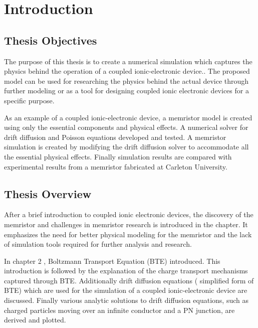 
\chapter{Introduction} %


\label{Chapter1} %


\section{Thesis Objectives}
\begin{doublespace}
The purpose of this thesis is to create a numerical simulation which captures the physics behind the operation of a coupled ionic-electronic device.. The proposed model can be used for researching the physics behind the actual device through further modeling or as a tool for designing coupled ionic electronic devices for a specific purpose. 

As an example of a coupled ionic-electronic device, a memristor model is created using only the essential components and physical effects. A numerical solver for  drift diffusion and Poisson equations  developed and tested. A memristor simulation is created by modifying the drift diffusion solver to accommodate all the essential physical effects. Finally simulation results are compared with experimental results from a memristor fabricated at Carleton University.

\section{Thesis Overview}

After a brief introduction to coupled ionic electronic devices, the discovery of the memristor and challenges in memristor research is introduced in the  chapter. It emphasizes the need for better physical modeling for the memristor and the lack of simulation tools required for further analysis and research.

In chapter 2 ,  Boltzmann Transport Equation (BTE)  introduced. This introduction is followed by the explanation of the charge transport mechanisms captured through  BTE. Additionally drift diffusion equations ( simplified form of BTE) which are used for the simulation of a coupled ionic-electronic device are discussed. Finally various analytic solutions to drift diffusion equations, such as charged particles moving over an infinite conductor and a PN junction, are derived and plotted. 


\end{doublespace}

